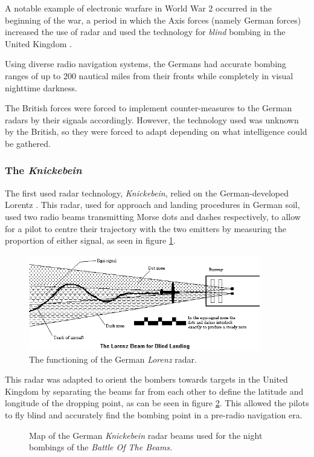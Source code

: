 \documentclass[english,purist]{ist-report}
\begin{document}
A notable example of electronic warfare in World War 2 occurred in the beginning of the war, a period in which the Axis forces (namely German forces) increased the use of radar and used the technology for \textit{blind} bombing in the United Kingdom \cite{wizardwar}.

Using diverse radio navigation systems, the Germans had accurate bombing ranges of up to 200 nautical miles from their fronts while completely in visual nighttime darkness.

The British forces were forced to implement counter-measures to the German radars by \jamming{} their signals accordingly. However, the technology used was unknown by the British, so they were forced to adapt depending on what intelligence could be gathered.

\subsubsection{The \textit{Knickebein}}

The first used radar technology, \textit{Knickebein}, relied on the German-developed Lorentz \cite{pentagonknickebein}. This radar, used for approach and landing procedures in German soil, used two radio beams transmitting Morse dots and dashes respectively, to allow for a pilot to centre their trajectory with the two emitters by measuring the proportion of either signal, as seen in figure \ref{fig:lorenz}.
\begin{figure}[ht]
    \centering
    \includegraphics[width = 0.9\textwidth,trim = {0 8mm 0 0}, clip]{lorenz}
    \caption{The functioning of the German \textit{Lorenz} radar.}
    \label{fig:lorenz}
\end{figure}

This radar was adapted to orient the bombers towards targets in the United Kingdom by separating the beams far from each other to define the latitude and longitude of the dropping point, as can be seen in figure \ref{fig:botb_map}. This allowed the pilots to fly blind and accurately find the bombing point in a pre-radio navigation era.
\begin{figure}[ht]
    \centering
    {\tiny }
    \caption{Map of the German \textit{Knickebein} radar beams used for the night bombings of the \textit{Battle Of The Beams.}}
    \label{fig:botb_map}
\end{figure}
\end{document}
